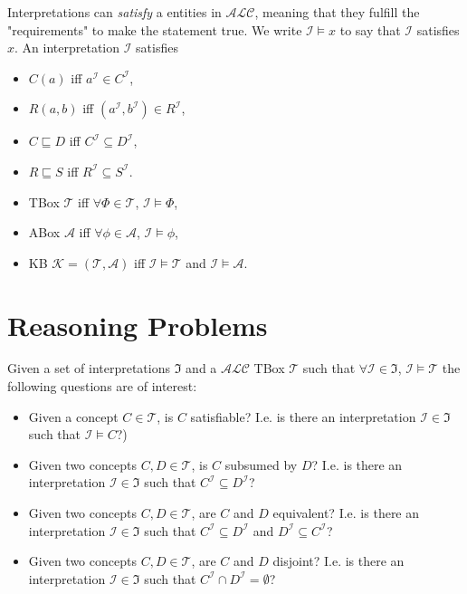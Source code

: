 Interpretations can \emph{satisfy} a entities in $\mathcal{ALC}$, meaning that they fulfill the "requirements" to make the statement true. We write $\mathcal{I} \models x$ to say that $\mathcal{I}$ satisfies $x$. An interpretation $\mathcal{I}$ satisfies
\begin{itemize}
    \item $C(a)$ iff $a^{\mathcal{I}} \in C^{\mathcal{I}}$,
    \item $R(a,b)$ iff $(a^{\mathcal{I}},b^{\mathcal{I}})  \in R^{\mathcal{I}}$,
    \item $C \sqsubseteq D$ iff $C^{\mathcal{I}} \subseteq D^{\mathcal{I}}$,
    \item $R \sqsubseteq S$ iff $R^{\mathcal{I}}  \subseteq S^{\mathcal{I}}$.
    \item TBox $\mathcal{T}$ iff $\forall \Phi \in \mathcal{T}$, $\mathcal{I} \models \Phi$,
    \item ABox $\mathcal{A}$ iff $\forall \phi \in \mathcal{A}$, $\mathcal{I} \models \phi$,
    \item KB $\mathcal{K} = (\mathcal{T}, \mathcal{A})$ iff $\mathcal{I} \models \mathcal{T}$ and $\mathcal{I} \models \mathcal{A}$.

\end{itemize}


\section{Reasoning Problems}
Given a set of interpretations $\mathfrak{I}$ and a $\mathcal{ALC}$ TBox $\mathcal{T}$ such that $\forall \mathcal{I} \in \mathfrak{I}$, $\mathcal{I}\models \mathcal{T}$ the following questions are of interest:
\begin{itemize}
    \item Given a concept $C \in \mathcal{T}$, is $C$ satisfiable? I.e. is there an interpretation $\mathcal{I} \in \mathfrak{I}$ such that $\mathcal{I} \models C$?)
    \item Given two concepts $C, D \in \mathcal{T}$, is $C$ subsumed by $D$? I.e. is there an interpretation $\mathcal{I} \in \mathfrak{I}$ such that $C^\mathcal{I} \subseteq D^\mathcal{I}$?
    \item Given two concepts $C, D \in \mathcal{T}$, are $C$ and $D$ equivalent? I.e. is there an interpretation $\mathcal{I} \in \mathfrak{I}$ such that $C^\mathcal{I} \subseteq D^\mathcal{I}$ and $D^\mathcal{I} \subseteq C^\mathcal{I}$?
    \item Given two concepts $C, D \in \mathcal{T}$, are $C$ and $D$ disjoint? I.e. is there an interpretation $\mathcal{I} \in \mathfrak{I}$ such that $C^\mathcal{I} \cap D^\mathcal{I} = \emptyset$?
\end{itemize}

